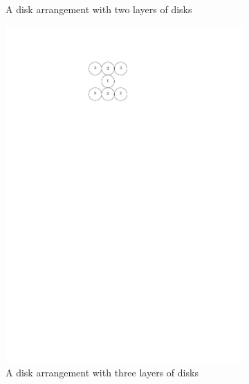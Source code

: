 \begin{figure}[h]
\begin{center}
\begin{subfigure}[b]{0.1\textwidth}
	  \caption{A disk arrangement with two layers of disks}
	  \label{fig:linkage-1-1}
  \end{subfigure}
  \begin{subfigure}[b]{0.4\textwidth}
	  \includegraphics[width=\textwidth]{graphics/degree3arrangement.pdf}
	  \caption{A disk arrangement with three layers of disks}
	  \label{fig:circlePacking1-2}
  \end{subfigure}
  \begin{subfigure}[b]{0.4\textwidth}

\end{subfigure}
\end{center}
\end{figure}
